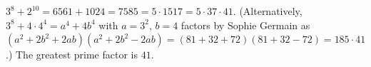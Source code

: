 $3^8+2^{10}=6561+1024=7585=5\cdot1517=5\cdot37\cdot41$. (Alternatively, $3^8+4\cdot4^4=a^4+4b^4$ with $a=3^2$, $b=4$ factors by Sophie Germain as $(a^2+2b^2+2ab)(a^2+2b^2-2ab)=(81+32+72)(81+32-72)=185\cdot41$.) The greatest prime factor is $\boxed{41}$.
